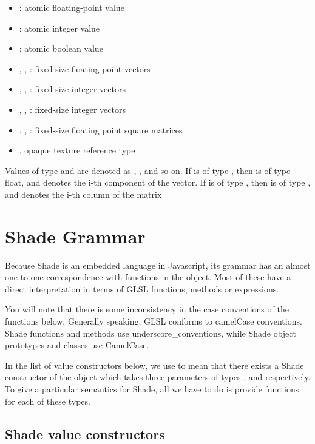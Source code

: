 \documentclass{article}
\begin{document}
\begin{itemize}
\item {}: atomic floating-point value
\item {}: atomic integer value
\item {}: atomic boolean value
\item {}, , : fixed-size floating point vectors
\item {}, , : fixed-size integer vectors
\item {}, , : fixed-size integer vectors
\item {}, , : fixed-size floating point square matrices
\item {}, opaque texture reference type
\end{itemize}

Values of type  and  are denoted as , , and so on. If  is of type
, then  is of type float, and denotes the i-th
component of the vector. If  is of type , then  is
of type , and denotes the i-th column of the matrix

\section{Shade Grammar}

Because Shade is an embedded language in Javascript, its grammar has
an almost one-to-one correspondence with functions in the 
object. Most of these have a direct interpretation in terms of GLSL
functions, methods or expressions.

You will note that there is some inconsistency in the case conventions
of the functions below. Generally speaking, GLSL conforms to camelCase
conventions. Shade functions and methods use underscore\_conventions,
while Shade object prototypes and classes use CamelCase.

In the list of value constructors below, we use  to
mean that there exists a Shade constructor of the object  which
takes three parameters of types ,  and  respectively. To
give a particular semantics for Shade, all we have to do is provide
functions for each of these types.

\subsection{Shade value constructors}
\end{document}
